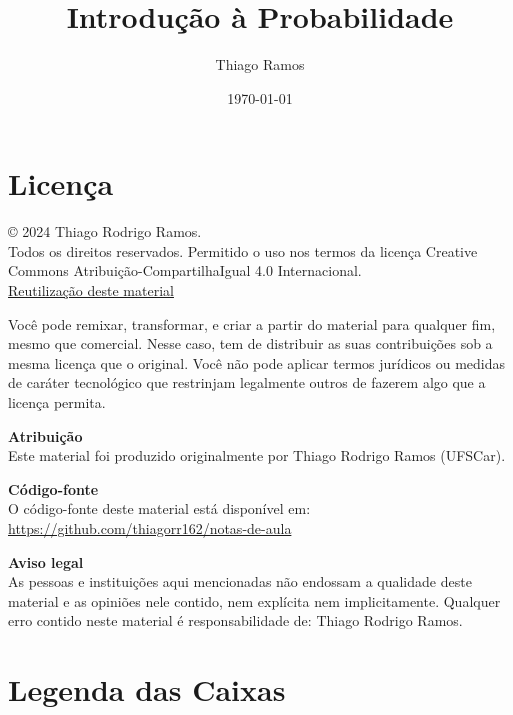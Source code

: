 \documentclass[12pt,a4paper,oneside]{book}
\theoremstyle{definition}
\theoremstyle{remark}
\numberwithin{equation}{section}
\begin{document}
\title{{\Huge Introdução à Probabilidade}}

\author{Thiago Ramos}

\maketitle


\section*{Licença}

© 2024 Thiago Rodrigo Ramos. \\
Todos os direitos reservados. Permitido o uso nos termos da licença Creative Commons Atribuição-CompartilhaIgual 4.0 Internacional. \\
\href{https://creativecommons.org/licenses/by-sa/4.0/}{Reutilização deste material}

Você pode remixar, transformar, e criar a partir do material para qualquer fim, mesmo que comercial. Nesse caso, tem de distribuir as suas contribuições sob a mesma licença que o original. Você não pode aplicar termos jurídicos ou medidas de caráter tecnológico que restrinjam legalmente outros de fazerem algo que a licença permita.


\noindent\textbf{Atribuição} \\
Este material foi produzido originalmente por Thiago Rodrigo Ramos (UFSCar).


\noindent\textbf{Código-fonte} \\
O código-fonte deste material está disponível em:
\url{https://github.com/thiagorr162/notas-de-aula}


\noindent\textbf{Aviso legal} \\
As pessoas e instituições aqui mencionadas não endossam a qualidade deste material e as opiniões nele contido, nem explícita nem implicitamente. Qualquer erro contido neste material é responsabilidade de: Thiago Rodrigo Ramos.

\vspace{5em}
\date{\today}

\newpage


\tableofcontents
\newpage 

\newpage


\section*{Legenda das Caixas}
\end{document}
